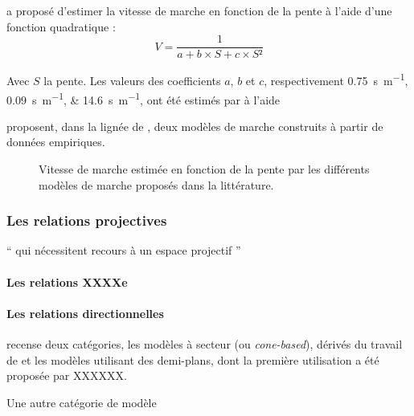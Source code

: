 \textcite{Rees2004} a proposé d'estimer la vitesse de marche en
fonction de la pente à l'aide d'une fonction quadratique :
\begin{equation}
  V = \dfrac{1}{a + b × S + c × S²}
\end{equation}

Avec \(S\) la pente. Les valeurs des coefficients \(a\), \(b\) et
\(c\), respectivement \SIlist{0,75;0,09;14,6}{\second\per\meter}, ont
été estimés par \textcite{Rees2004} à l'aide

\textcite{Irmischer2017,Kerouanton2020} proposent, dans la lignée de
\textcite{Tobler1993}, deux modèles de marche construits à partir de
données empiriques.



\begin{figure}
  \centering
  \caption{Vitesse de marche estimée en fonction de la pente par les
    différents modèles de marche proposés dans la littérature.}
  \label{fig:modeles_marche}
\end{figure}


\subsubsection{Les relations projectives}

\enquote{\textelp{} qui nécessitent recours à un espace projectif
  \textelp{}} \autocite[p. 18]{Duchene2019}

\paragraph{Les relations XXXXe}

\paragraph{Les relations directionnelles}


\textcite{Frank,} recense deux catégories, les modèles à secteur (ou
\emph{cone-based}), dérivés du travail de \textcite{Peuquet1987} et
les modèles utilisant des demi-plans, dont la première utilisation a
été proposée par XXXXXX.






%
Une autre catégorie de modèle 

